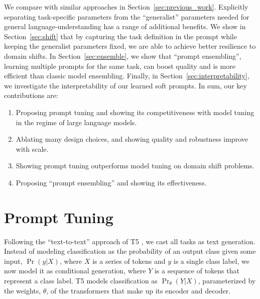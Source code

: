 We compare with similar approaches in Section~\ref{sec:previous_work}. Explicitly separating task-specific parameters from the ``generalist'' parameters needed for general language-understanding has a range of additional benefits. We show in Section~\ref{sec:shift} that by capturing the task definition in the prompt while keeping the generalist parameters fixed, we are able to achieve better resilience to domain shifts. In Section~\ref{sec:ensemble}, we show that ``prompt ensembling'', learning multiple prompts for the same task, can boost quality and is more efficient than classic model ensembling. Finally, in Section~\ref{sec:interpretability}, we investigate the interpretability of our learned soft prompts. In sum, our key contributions are:

\begin{enumerate} [topsep=3pt,itemsep=-1ex,partopsep=1ex,parsep=1ex]
\item Proposing prompt tuning and showing its competitiveness with model tuning in the regime of large language models.
\item Ablating many design choices, and showing quality and robustness improve with scale.
\item Showing prompt tuning outperforms model tuning on domain shift problems.
\item Proposing ``prompt ensembling'' and showing its effectiveness.
\end{enumerate}

\section{Prompt Tuning}
\label{sec:tuning}

Following the ``text-to-text'' approach of T5 \cite{raffel_2020_t5}, we cast all tasks as text generation. Instead of modeling classification as the probability of an output class given some input, $\Pr(y|X)$, where $X$ is a series of tokens and $y$ is a single class label, we now model it as conditional generation, where $Y$ is a sequence of tokens that represent a class label. T5 models classification as $\Pr_{\theta}(Y | X)$, parameterized by the weights, $\theta$, of the transformers \cite{vaswani2017attention} that make up its encoder and decoder.

